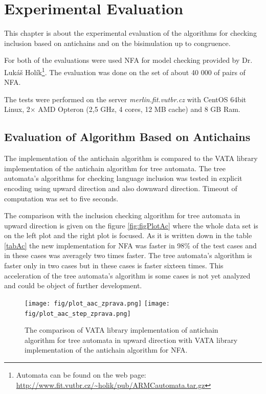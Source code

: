 \chapter{Experimental Evaluation}
\label{eval}
This chapter is about the experimental evaluation of the algorithms for checking inclusion based on antichains and on the bisimulation up to congruence. 

For both of the evaluations were used NFA for model checking provided by Dr. Lukáš Holík\footnote{
Automata can be found on the web page: \url{http://www.fit.vutbr.cz/~holik/pub/ARMCautomata.tar.gz}}.  
The evaluation was done on the set of about 40 000 of pairs of NFA. 

The tests were performed on the server \emph{merlin.fit.vutbr.cz} with CentOS 64bit Linux, 2$\times$ AMD Opteron (2,5 GHz, 4 cores, 12 MB cache) and 8 GB Ram.

\section{Evaluation of Algorithm Based on Antichains}
The implementation of the antichain algorithm is compared to the VATA library implementation of the antichain algorithm for tree automata. The tree automata's
algorithms for checking language inclusion was tested in explicit encoding using upward direction and also downward direction. 
Timeout of computation was set to five seconds.

The comparison with the inclusion checking algorithm for tree automata in upward direction is given on the figure \ref{fig:figPlotAc} where the whole data
set is on the left plot and the right plot is focused. As it is written down in the table \ref{tabAc} the new implementation for NFA was faster in 98\% of the
test cases and in these cases was averagely two times faster. The tree automata's algorithm is faster only in two cases but in these cases is faster sixteen times.
This acceleration of the tree automata's algorithm is some cases is not yet analyzed and could be object of further development.

\begin{figure}[bt]
\begin{center}
\texttt{[image: fig/plot\_aac\_zprava.png]}
\texttt{[image: fig/plot\_aac\_step\_zprava.png]}
\caption{The comparison of VATA library implementation of antichain algorithm for tree automata in upward direction
    with VATA library implementation of the antichain algorithm for NFA.}
\label{fig:figPlotAac}
\end{center}
\end{figure}


